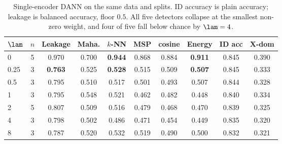 \begin{table}[t]
\centering
\small
\caption{Single-encoder DANN on the same data and splits. ID accuracy is plain accuracy;
leakage is balanced accuracy, floor $0.5$. All five detectors collapse at the smallest
non-zero weight, and four of five fall below chance by $\lam = 4$.}
\label{tab:single}
\begin{tabular}{lccccccccc}
\toprule
$\lam$ & $n$ & Leakage & Maha. & $k$-NN & MSP & cosine & Energy & ID acc & X-dom \\
\midrule
0    & 5 & 0.970 & 0.700 & \textbf{0.944} & 0.868 & 0.884 & \textbf{0.911} & 0.845 & 0.390 \\
0.25 & 3 & \textbf{0.763} & 0.525 & \textbf{0.528} & 0.515 & 0.509 & \textbf{0.507} & 0.845 & 0.333 \\
0.5  & 3 & 0.795 & 0.510 & 0.517 & 0.501 & 0.493 & 0.507 & 0.844 & 0.328 \\
1    & 3 & 0.795 & 0.548 & 0.521 & 0.462 & 0.482 & 0.448 & 0.840 & 0.334 \\
2    & 5 & 0.807 & 0.509 & 0.516 & 0.479 & 0.468 & 0.470 & 0.839 & 0.325 \\
4    & 3 & 0.798 & 0.502 & 0.486 & 0.471 & 0.454 & 0.449 & 0.835 & 0.320 \\
8    & 3 & 0.787 & 0.520 & 0.532 & 0.519 & 0.490 & 0.500 & 0.832 & 0.321 \\
\bottomrule
\end{tabular}
\end{table}


